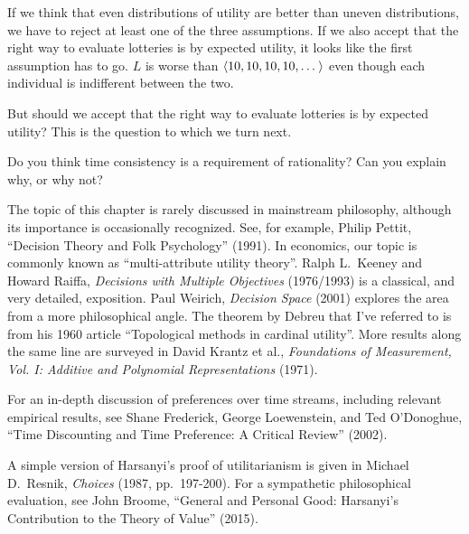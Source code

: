 If we think that even distributions of utility are better than uneven
distributions, we have to reject at least one of the three assumptions. If we
also accept that the right way to evaluate lotteries is by expected utility, it
looks like the first assumption has to go. $L$ is worse than
$\t{10,10,10,10,\ldots}$ even though each individual is indifferent between the
two.

But should we accept that the right way to evaluate lotteries is by
expected utility? This is the question to which we turn next.


\begin{essay}
  Do you think time consistency is a requirement of rationality? Can you
  explain why, or why not?
\end{essay}

\begin{sources}

  The topic of this chapter is rarely discussed in mainstream philosophy,
  although its importance is occasionally recognized. See, for example, Philip
  Pettit, ``Decision Theory and Folk Psychology'' (1991). In economics, our
  topic is commonly known as ``multi-attribute utility theory''. Ralph L.\
  Keeney and Howard Raiffa, \emph{Decisions with Multiple Objectives}
  (1976/1993) is a classical, and very detailed, exposition. Paul Weirich,
  \emph{Decision Space} (2001) explores the area from a more philosophical
  angle. The theorem by Debreu that I've referred to is from his 1960 article
  ``Topological methods in cardinal utility''. More results along the same line
  are surveyed in David Krantz et al., \emph{Foundations of Measurement, Vol. I:
    Additive and Polynomial Representations} (1971).

  For an in-depth discussion of preferences over time streams, including
  relevant empirical results, see Shane Frederick, George Loewenstein, and Ted
  O'Donoghue, ``Time Discounting and Time Preference: A Critical Review''
  (2002).

  A simple version of Harsanyi's proof of utilitarianism is given in Michael D.\
  Resnik, \emph{Choices} (1987, pp.~197-200). For a sympathetic philosophical
  evaluation, see John Broome, ``General and Personal Good: Harsanyi's
  Contribution to the Theory of Value'' (2015).
  
\end{sources}



